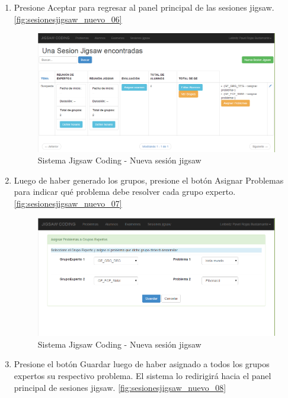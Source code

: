 \begin{enumerate}
\begin{figure}[h!]
	\end{figure}
	\item Presione Aceptar para regresar al panel principal de las sesiones jigsaw. \autoref{fig:sesionesjigsaw_nuevo_06}
	\begin{figure}[h!]
		\centering
		\caption{Sistema Jigsaw Coding - Nueva sesión jigsaw}
		\label{fig:sesionesjigsaw_nuevo_06}
		\includegraphics[scale=0.5]{figuras/usodelsistema/docente/sesionesjigsaw_nuevo_06}
	\end{figure}
	\item Luego de haber generado los grupos, presione el botón Asignar Problemas para indicar qué problema debe resolver cada grupo experto. \autoref{fig:sesionesjigsaw_nuevo_07}
	\begin{figure}[h!]
		\centering
		\caption{Sistema Jigsaw Coding - Nueva sesión jigsaw}
		\label{fig:sesionesjigsaw_nuevo_07}
		\includegraphics[scale=0.5]{figuras/usodelsistema/docente/sesionesjigsaw_nuevo_07}
	\end{figure}
	\item Presione el botón Guardar luego de haber asignado a todos los grupos expertos su respectivo problema. El sistema lo redirigirá hacia el panel principal de sesiones jigsaw. \autoref{fig:sesionesjigsaw_nuevo_08}
	\begin{figure}[h!]

\end{figure}
\end{enumerate}
